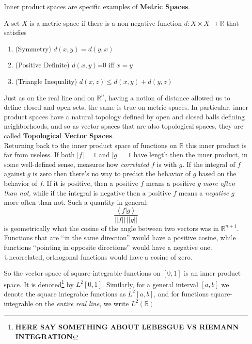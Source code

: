 \documentclass[../master.tex]{subfiles}
\begin{document}
	Inner product spaces are specific examples of \textbf{Metric Spaces}. 
	\begin{defn}
		A set $X$ is a metric space if there is a non-negative function $d:X\times X \rightarrow \mathbb R$ that satisfies
		\begin{enumerate}
			\item (Symmetry) $d(x,y)=d(y,x)$
			\item (Positive Definite) $d(x,y)$=0 iff $x=y$
			\item (Triangle Inequality) $d(x,z) \leq d(x,y) + d(y,z)$
		\end{enumerate}
	\end{defn}
	Just as on the real line and on $\mathbb{R}^n$, having a notion of distance allowed us to define closed and open sets, the same is true on metric spaces. In particular, inner product spaces have a natural topology defined by open and closed balls defining neighborhoods, and so as vector spaces that are also topological spaces, they are called \textbf{Topological Vector Spaces}.\\
	
	Returning back to the inner product space of functions on $\mathbb R$ this inner product is far from useless. If both $|f|=1$ and $|g|=1$ have length then the inner product, in some well-defined sense, measures how \emph{correlated} $f$ is with $g$. If the integral of $f$ against $g$ is zero then there's no way to predict the behavior of $g$ based on the behavior of $f$. If it is positive, then a positive $f$ means a positive $g$ \emph{more often than not}, while if the integral is negative then a positive $f$ means a \emph{negative} $g$ more often than not. Such a quantity in general: 
	\begin{equation*}
		\frac{\left< f | g \right>}{||f|| ~ ||g||}
	\end{equation*}
	is geometrically what the cosine of the angle between two vectors was in $\mathbb R^{n+1}$. Functions that are ``in the same direction'' would have a positive cosine, while functions ``pointing in opposite directions'' would have a negative one. Uncorrelated, orthogonal functions would have a cosine of zero.
	
	So the vector space of square-integrable functions on $[0,1]$ is an inner product space. It is denoted\footnote{\textbf{HERE SAY SOMETHING ABOUT LEBESGUE VS RIEMANN INTEGRATION}} by $L^2[0,1]$. Similarly, for a general interval $[a,b]$ we denote the square integrable functions as $L^2 [a,b]$, and for functions square-integrable on the \emph{entire real line}, we write $L^2 (\mathbb R)$
	
\end{document}
